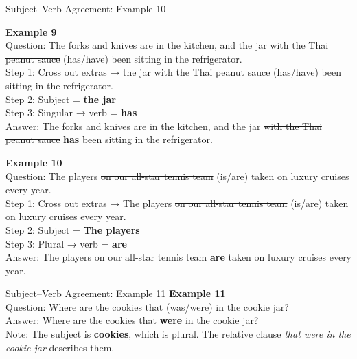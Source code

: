 \documentclass[aspectratio=169,11pt]{beamer}
\begin{document}
\begin{frame}{Subject–Verb Agreement: Example 10}

\small
\textbf{Example 9} \\
Question: The forks and knives are in the kitchen, and the jar \sout{with the Thai peanut sauce} (has/have) been sitting in the refrigerator. \\
Step 1: Cross out extras → the jar \sout{with the Thai peanut sauce} (has/have) been sitting in the refrigerator. \\
Step 2: Subject = \textbf{the jar} \\
Step 3: Singular → verb = \textbf{has} \\
Answer: The forks and knives are in the kitchen, and the jar \sout{with the Thai peanut sauce} \textbf{has} been sitting in the refrigerator.

\vspace{0.9em}
\textbf{Example 10} \\
Question: The players \sout{on our all-star tennis team} (is/are) taken on luxury cruises every year. \\
Step 1: Cross out extras → The players \sout{on our all-star tennis team} (is/are) taken on luxury cruises every year. \\
Step 2: Subject = \textbf{The players} \\
Step 3: Plural → verb = \textbf{are} \\
Answer: The players \sout{on our all-star tennis team} \textbf{are} taken on luxury cruises every year.
\end{frame}

\begin{frame}{Subject–Verb Agreement: Example 11}
\small
\textbf{Example 11} \\
Question: Where are the cookies that (was/were) in the cookie jar? \\
Answer: Where are the cookies that \textbf{were} in the cookie jar? \\

\vspace{0.5em}
Note: The subject is \textbf{cookies}, which is plural. The relative clause \emph{that were in the cookie jar} describes them.
\end{frame}
\end{document}
